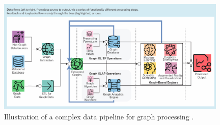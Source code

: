 \begin{figure}[hbtp]
  \centering
  \includegraphics[width=0.98\textwidth]{out/about-graph-processing.jpg}
  \caption{Illustration of a complex data pipeline for graph processing \cite{graph-sakr21}.}
  \label{fig:about-graph-processing}
\end{figure}
